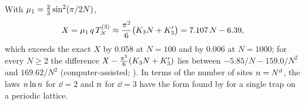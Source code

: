 With $\mu_{1}=\tfrac23\sin^{2}(\pi/2N)$,
\begin{equation}\label{s4_mfpt:eq-X3d}
  X=\mu_{1}\,q\,T_{N}^{(3)}\approx\frac{\pi^{2}}{6}\bigl(K_{3} N+K_{3}'\bigr)=7.107\,N-6.39 ,
\end{equation}
which exceeds the exact $X$ by $0.058$ at $N=100$ and by $0.006$ at $N=1000$; for every $N\ge2$ the difference
$X-\frac{\pi^{2}}{6}(K_{3} N+K_{3}')$ lies between $-5.85/N-159.0/N^{2}$ and $169.62/N^{2}$ (computer-assisted;
).
In terms of the number of sites $n=N^{d}$, the laws $n\ln n$ for $\dd=2$ and $n$ for $\dd=3$ have the form found
by \citet{Montroll1969} for a single trap on a periodic lattice.

